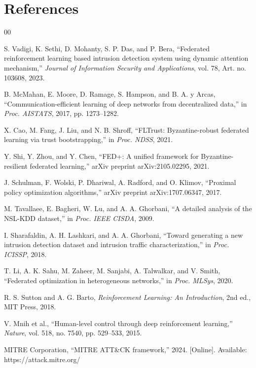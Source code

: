 \documentclass[conference]{IEEEtran}
\begin{document}
\section*{References}

\begin{thebibliography}{00}

S. Vadigi, K. Sethi, D. Mohanty, S. P. Das, and P. Bera,
``Federated reinforcement learning based intrusion detection system using dynamic attention mechanism,''
\textit{Journal of Information Security and Applications}, vol. 78, Art. no. 103608, 2023.

B. McMahan, E. Moore, D. Ramage, S. Hampson, and B. A. y Arcas, 
``Communication-efficient learning of deep networks from decentralized data,'' 
in \textit{Proc. AISTATS}, 2017, pp. 1273--1282.

X. Cao, M. Fang, J. Liu, and N. B. Shroff, 
``FLTrust: Byzantine-robust federated learning via trust bootstrapping,'' 
in \textit{Proc. NDSS}, 2021.

Y. Shi, Y. Zhou, and Y. Chen, 
``FED+: A unified framework for Byzantine-resilient federated learning,'' 
arXiv preprint arXiv:2105.02295, 2021.

J. Schulman, F. Wolski, P. Dhariwal, A. Radford, and O. Klimov, 
``Proximal policy optimization algorithms,'' 
arXiv preprint arXiv:1707.06347, 2017.

M. Tavallaee, E. Bagheri, W. Lu, and A. A. Ghorbani, 
``A detailed analysis of the NSL-KDD dataset,'' 
in \textit{Proc. IEEE CISDA}, 2009.

I. Sharafaldin, A. H. Lashkari, and A. A. Ghorbani, 
``Toward generating a new intrusion detection dataset and intrusion traffic characterization,'' 
in \textit{Proc. ICISSP}, 2018.

T. Li, A. K. Sahu, M. Zaheer, M. Sanjabi, A. Talwalkar, and V. Smith, 
``Federated optimization in heterogeneous networks,'' 
in \textit{Proc. MLSys}, 2020.

R. S. Sutton and A. G. Barto, 
\textit{Reinforcement Learning: An Introduction}, 2nd ed., MIT Press, 2018.

V. Mnih et al., 
``Human-level control through deep reinforcement learning,'' 
\textit{Nature}, vol. 518, no. 7540, pp. 529--533, 2015.

MITRE Corporation,
``MITRE ATT\&CK framework,'' 2024. [Online]. Available: https://attack.mitre.org/


\end{thebibliography}
\end{document}
